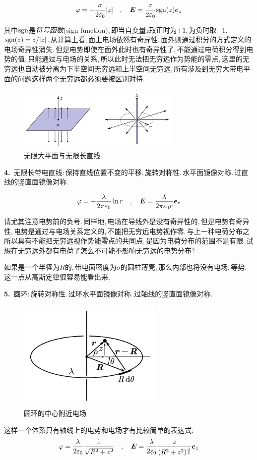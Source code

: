 \[\varphi =-\frac{\sigma}{2\varepsilon_0}|z| \quad,\quad \boldsymbol{E}=\frac{\sigma}{2\varepsilon_0} {\rm sgn}(z)\boldsymbol{e}_z\]

其中${\rm sgn}$是\emph{符号函数}(sign function),\,即当自变量$z$取正时为$+1$,\,为负时取$-1$.\,${\rm sgn}(z)=z/|z|$.\,从计算上看,\,面上电场依然有奇异性.\,面外则通过积分的方式定义的电场奇异性消失.\,但是电势即使在面外此时也有奇异性了,\,不能通过电荷积分得到电势的值,\,只能通过与电场的关系,\,所以此时无法把无穷远作为势能的零点,\,这里的无穷远也自动被分离为下半空间无穷远和上半空间无穷远,\,所有涉及到无穷大带电平面的问题这样两个无穷远都必须要被区别对待.



\begin{figure}[H]
\centering
\includegraphics[width=0.7\textwidth]{image/7-1-19.png}
\caption{无限大平面与无限长直线}\label{fig7-1-19}
\end{figure}

\textbf{4.}\, 无限长带电直线:\,保持直线位置不变的平移,\,旋转对称性.\,水平面镜像对称.\,过直线的竖直面镜像对称.

\[\varphi =-\frac{\lambda}{2\pi\varepsilon_0}\ln r \quad,\quad \boldsymbol{E}=\frac{\lambda}{2\pi\varepsilon_0 r}\boldsymbol{e}_r\]

请尤其注意电势前的负号.\,同样地,\,电场在导线外是没有奇异性的,\,但是电势有奇异性,\,电势是通过与电场关系定义的,\,不能把无穷远电势视作零.\,与上一种电荷分布之所以具有不能把无穷远视作势能零点的共同点,\,是因为电荷分布的范围不是有限.\,试想在无穷远外都有电荷了怎么不可能不影响无穷远的电势分布?

如果是一个半径为$R$的,\,带电面密度为$\sigma$的圆柱薄壳,\,那么内部也将没有电场,\,等势.\,这一点从高斯定律很容易能看出来.

\vspace{0.3cm}
\textbf{5.}\, 圆环:\,旋转对称性.\,过环水平面镜像对称.\,过轴线的竖直面镜像对称.

\begin{figure}
\centering
\includegraphics[width=7cm]{image/7-1-20.png}
\caption{圆环的中心附近电场}
\end{figure}
这样一个体系只有轴线上的电势和电场才有比较简单的表达式:
\[\varphi=\frac{\lambda}{2\varepsilon_0}\frac{1}{\sqrt{R^2+z^2}} \quad, \quad \boldsymbol{E}=\frac{\lambda}{2\varepsilon_0}\frac{z}{(R^2+z^2)^{\frac{3}{2}}}\boldsymbol{e}_z\]

